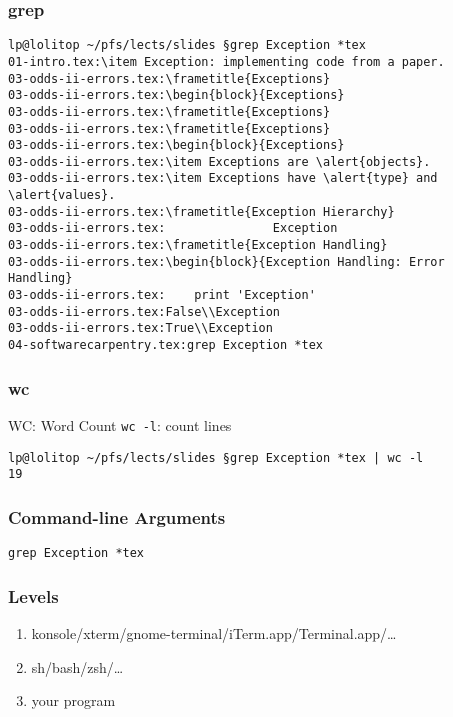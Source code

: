 \begin{frame}[fragile]
\frametitle{grep}

\begin{verbatim}
lp@lolitop ~/pfs/lects/slides §grep Exception *tex
01-intro.tex:\item Exception: implementing code from a paper.
03-odds-ii-errors.tex:\frametitle{Exceptions}
03-odds-ii-errors.tex:\begin{block}{Exceptions}
03-odds-ii-errors.tex:\frametitle{Exceptions}
03-odds-ii-errors.tex:\frametitle{Exceptions}
03-odds-ii-errors.tex:\begin{block}{Exceptions}
03-odds-ii-errors.tex:\item Exceptions are \alert{objects}.
03-odds-ii-errors.tex:\item Exceptions have \alert{type} and \alert{values}.
03-odds-ii-errors.tex:\frametitle{Exception Hierarchy}
03-odds-ii-errors.tex:               Exception
03-odds-ii-errors.tex:\frametitle{Exception Handling}
03-odds-ii-errors.tex:\begin{block}{Exception Handling: Error Handling}
03-odds-ii-errors.tex:    print 'Exception'
03-odds-ii-errors.tex:False\\Exception
03-odds-ii-errors.tex:True\\Exception
04-softwarecarpentry.tex:grep Exception *tex
\end{verbatim}

\end{frame}

\begin{frame}[fragile]
\frametitle{wc}
\begin{block}{WC: Word Count}
\texttt{wc -l}: count lines
\end{block}
\end{frame}

\begin{frame}[fragile]
\begin{verbatim}
lp@lolitop ~/pfs/lects/slides §grep Exception *tex | wc -l
19
\end{verbatim}
\end{frame}

\begin{frame}[fragile]
\frametitle{Command-line Arguments}
\begin{verbatim}
grep Exception *tex
\end{verbatim}
\end{frame}

\begin{frame}[fragile]
\frametitle{Levels}
\begin{enumerate}
\item konsole/xterm/gnome-terminal/iTerm.app/Terminal.app/\ldots
\item sh/bash/zsh/\ldots
\item your program
\end{enumerate}
\end{frame}

